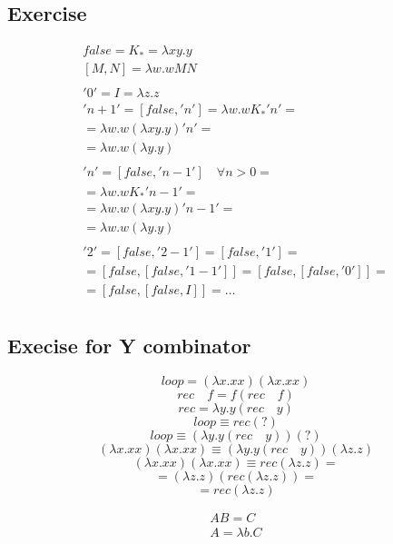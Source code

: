 \documentclass[11pt]{article}
\begin{document}
\subsection*{Exercise}
\begin{gather*}
false = K_* = \lambda xy.y\\
[M,N] = \lambda w.wMN\\
\\
'0' = I = \lambda z.z\\
'n+1' = [false, 'n'] = \lambda w.w K_* 'n' =\\
= \lambda w.w (\lambda xy.y)'n' =\\
= \lambda w.w (\lambda y.y)\\
\\
'n' = [false,'n-1'] \quad \forall n>0 = \\
= \lambda w.w K_* 'n-1' = \\
= \lambda w.w (\lambda xy.y) 'n-1' = \\
= \lambda w.w (\lambda y.y)\\
\\
'2' = [false,'2-1'] = [false,'1'] = \\
= [false, [false, '1-1']] = [false, [false, '0']] = \\
= [false, [false, I]] = \dots
\\
\end{gather*}

\subsection*{Execise for Y combinator}
\[
loop = (\lambda x.xx) (\lambda x.xx)
\]
\[
rec \quad f = f (rec \quad f)
\]
\[
rec = \lambda y. y (rec \quad y)
\]
\[
loop \equiv rec (?)
\]
\[
loop \equiv (\lambda y. y (rec \quad y))(?)
\]
\[
(\lambda x.xx)(\lambda x.xx) \equiv (\lambda y. y (rec \quad y))(\lambda z.z)
\]
\[
(\lambda x.xx)(\lambda x.xx) \equiv rec (\lambda z.z) =
\]
\[
= (\lambda z.z)(rec (\lambda z.z)) =
\]
\[
= rec (\lambda z.z)
\]

\begin{gather*}
AB = C \\
A = \lambda b. C
\end{gather*}
\end{document}
